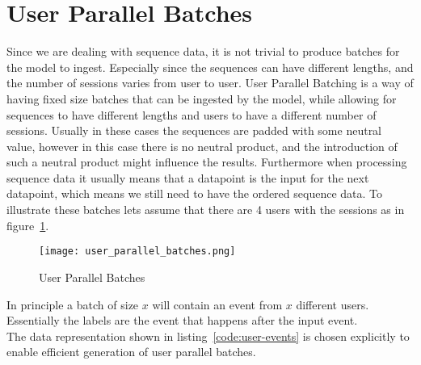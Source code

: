 \section{User Parallel Batches}
Since we are dealing with sequence data, it is not trivial to produce batches for the model to ingest.
Especially since the sequences can have different lengths, and the number of sessions varies from user to user.
User Parallel Batching is a way of having fixed size batches that can be ingested by the model, while allowing for sequences to have different lengths and users to have a different number of sessions.
Usually in these cases the sequences are padded with some neutral value, however in this case there is no neutral product, and the introduction of such a neutral product might influence the results.
Furthermore when processing sequence data it usually means that a datapoint is the input for the next datapoint, which means we still need to have the ordered sequence data.
To illustrate these batches lets assume that there are 4 users with the sessions as in figure~\ref{fig:user_parallel_batches}.

\begin{figure}[h]
	\centering
	\captionsetup{width=0.8\textwidth}
    \texttt{[image: user\_parallel\_batches.png]}
    \caption{User Parallel Batches}
    \label{fig:user_parallel_batches}
\end{figure}

In principle a batch of size $x$ will contain an event from $x$ different users.
Essentially the labels are the event that happens after the input event.
\\
The data representation shown in listing~\ref{code:user-events} is chosen explicitly to enable efficient generation of user parallel batches.

